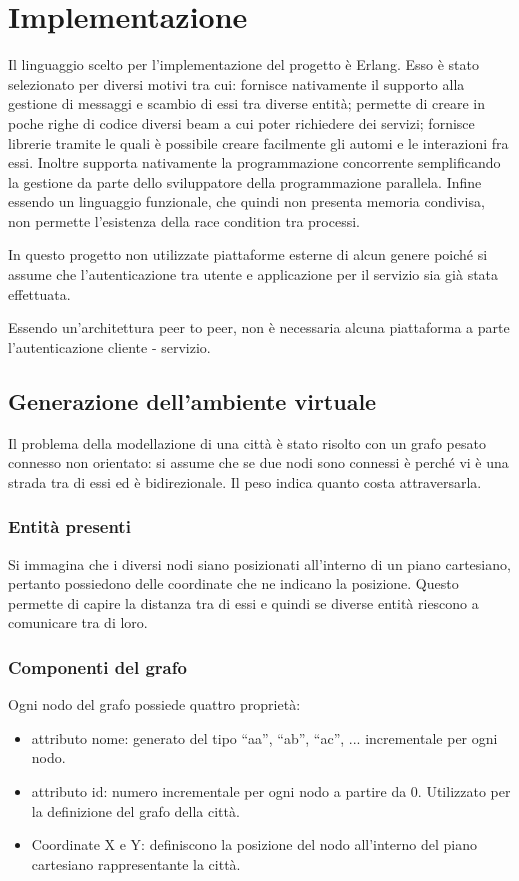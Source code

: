 
\chapter{Implementazione}

Il linguaggio scelto per l'implementazione del progetto è Erlang. Esso è stato selezionato per diversi motivi tra cui: fornisce nativamente il supporto alla gestione di messaggi e scambio di essi tra diverse entità; permette di creare in poche righe di codice diversi beam a cui poter richiedere dei servizi; fornisce librerie tramite le quali è possibile creare facilmente gli automi e le interazioni fra essi. Inoltre supporta nativamente la programmazione concorrente semplificando la gestione da parte dello sviluppatore della programmazione parallela. Infine essendo un linguaggio funzionale, che quindi non presenta memoria condivisa, non permette l'esistenza della race condition tra processi.

In questo progetto non utilizzate piattaforme esterne di alcun genere poiché si assume che l'autenticazione tra utente e applicazione per il servizio sia già stata effettuata.

Essendo un'architettura peer to peer, non è necessaria alcuna piattaforma a parte l'autenticazione cliente - servizio.

\section{Generazione dell'ambiente virtuale}
Il problema della modellazione di una città è stato risolto con un grafo pesato connesso non orientato: si assume che se due nodi sono connessi è perché vi è una strada tra di essi ed è bidirezionale. Il peso indica quanto costa attraversarla. 

\subsection{Entità presenti}
Si immagina che i diversi nodi siano posizionati all'interno di un piano cartesiano, pertanto possiedono delle coordinate che ne indicano la posizione. Questo permette di capire la distanza tra di essi e quindi se diverse entità riescono a comunicare tra di loro.

\subsection{Componenti del grafo} \label{componenti_grafo_citta}
Ogni nodo del grafo possiede quattro proprietà:
\begin{itemize}
	\item attributo nome: generato del tipo ``aa'', ``ab'', ``ac'', ... incrementale per ogni nodo.
	\item attributo id: numero incrementale per ogni nodo a partire da 0. Utilizzato per la definizione del grafo della città.
	\item Coordinate X e Y: definiscono la posizione del nodo all'interno del piano cartesiano rappresentante la città.
\end{itemize}

